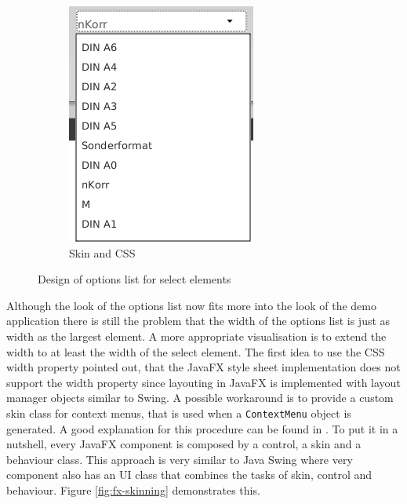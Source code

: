 \begin{figure}
\begin{subfigure}[b]{0.3\textwidth}
                \includegraphics[width=\textwidth]{./img/impl/context_menu_final.png}
                \caption{Skin and CSS}
                \label{fig:context_menu_final}
        \end{subfigure}
        \caption{Design of options list for select elements}\label{fig:context_menu_comp}
\end{figure}

Although the look of the options list now fits more into the look of the demo application there is still the problem that the width of the options list is just as width as the largest element.
A more appropriate visualisation is to extend the width to at least the width of the select element. 
The first idea to use the CSS width property pointed out, that the JavaFX style sheet implementation does not support the width property since layouting in JavaFX is implemented with layout manager objects similar to Swing. 
A possible workaround is to provide a custom skin class for context menus, that is used when a \texttt{ContextMenu} object is generated. 
A good explanation for this procedure can be found in \autocite{impl:fx-ui-controls}. 
To put it in a nutshell, every JavaFX component is composed by a control, a skin and a behaviour class. 
This approach is very similar to Java Swing where very component also has an UI class that combines the tasks of skin, control and behaviour. 
Figure \ref{fig:fx-skinning} demonstrates this.


